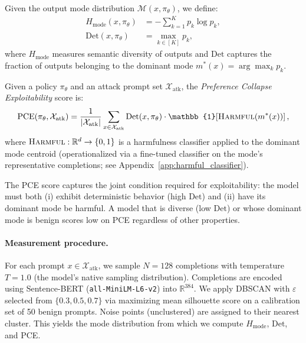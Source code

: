 \begin{definition}
\label{def:mode_entropy}
Given the output mode distribution $\mathcal{M}(x, \pi_\theta)$, we define:
\begin{align}
H_{\text{mode}}(x, \pi_\theta) &= -\sum_{k=1}^K p_k \log p_k, \label{eq:mode_entropy}\\
\text{Det}(x, \pi_\theta) &= \max_{k \in [K]} p_k, \label{eq:determinism}
\end{align}
where $H_{\text{mode}}$ measures semantic diversity of outputs and $\text{Det}$ captures the fraction of outputs belonging to the dominant mode $m^*(x) = \arg\max_k p_k$.
\end{definition}

\begin{definition}
\label{def:pce}
Given a policy $\pi_\theta$ and an attack prompt set $\mathcal{X}_{\text{atk}}$, the \emph{Preference Collapse Exploitability} score is:
\begin{equation}
\label{eq:pce}
\text{PCE}(\pi_\theta, \mathcal{X}_{\text{atk}}) = \frac{1}{|\mathcal{X}_{\text{atk}}|}\sum_{x \in \mathcal{X}_{\text{atk}}} \text{Det}(x, \pi_\theta) \cdot \mathbb{1}\!\left[\textsc{Harmful}(m^*(x))\right],
\end{equation}
where $\textsc{Harmful}: \mathbb{R}^d \to \{0,1\}$ is a harmfulness classifier applied to the dominant mode centroid (operationalized via a fine-tuned classifier on the mode's representative completions; see Appendix~\ref{app:harmful_classifier}).
\end{definition}

The PCE score captures the joint condition required for exploitability: the model must both (i) exhibit deterministic behavior (high $\text{Det}$) and (ii) have its dominant mode be harmful. A model that is diverse (low $\text{Det}$) or whose dominant mode is benign scores low on PCE regardless of other properties.

\paragraph{Measurement procedure.} For each prompt $x \in \mathcal{X}_{\text{atk}}$, we sample $N = 128$ completions with temperature $T = 1.0$ (the model's native sampling distribution). Completions are encoded using Sentence-BERT (\texttt{all-MiniLM-L6-v2}) into $\mathbb{R}^{384}$. We apply DBSCAN with $\varepsilon$ selected from $\{0.3, 0.5, 0.7\}$ via maximizing mean silhouette score on a calibration set of 50 benign prompts. Noise points (unclustered) are assigned to their nearest cluster. This yields the mode distribution from which we compute $H_{\text{mode}}$, $\text{Det}$, and PCE.


